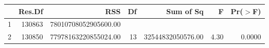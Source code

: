 \begin{table}[ht]
\centering
\begin{tabular}{lrrrrrr}
  \hline
 & Res.Df & RSS & Df & Sum of Sq & F & Pr($>$F) \\ 
  \hline
1 & 130863 & 78010708052905600.00 &  &  &  &  \\ 
  2 & 130850 & 77978163220855024.00 & 13 & 32544832050576.00 & 4.30 & 0.0000 \\ 
   \hline
\end{tabular}
\end{table}
